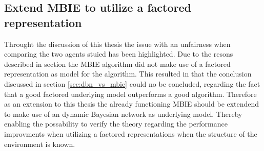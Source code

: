\subsection{Extend MBIE to utilize a factored representation }
Throught the discussion of this thesis the issue with an unfairness when comparing the two agents stuied has been highlighted. Due to the resons described in section  the MBIE algorithm did not make use of a factored representation as model for the algorithm. This resulted in that the conclusion discussed in section \ref{sec:dbn_vs_mbie} could no be concluded, regarding the fact that a good factored underlying model outperforms a good algorithm. Therefore as an extension to this thesis the already functioning MBIE should be extendend to make use of an dynamic Bayesian network as underlying model. Thereby enabling the possability to verify the theory regarding the performance improvments when utilizing a factored representations when the structure of the environment is known.
